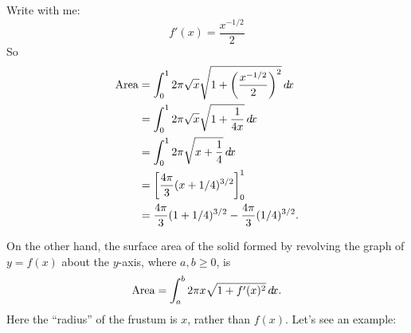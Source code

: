 \documentclass{ximera}
\begin{document}
\begin{example}
\begin{explanation}
\begin{image}
    \end{image}
    Write with me:
    \[
    f'(x) = \frac{x^{-1/2}}{2}
    \]
    So
    \begin{align*}
      \text{Area} &= \int_0^1 2\pi \sqrt{x} \sqrt{1 + \left(\frac{x^{-1/2}}{2}\right)^2} \mathop{}\!d\! x\\
      &= \int_0^1 2\pi \sqrt{x} \sqrt{1 + \frac{1}{4x}} \mathop{}\!d\! x\\
      &= \int_0^1 2\pi \sqrt{x+\frac{1}{4}} \mathop{}\!d\! x\\
      &= \bigg[ \frac{4\pi}{3}(x+1/4)^{3/2} \bigg]_0^1\\
      &= \frac{4\pi}{3}(1+1/4)^{3/2}  - \frac{4\pi}{3}(1/4)^{3/2}.
    \end{align*}
  \end{explanation}
\end{example}


On the other hand, the surface area of the solid formed by revolving
the graph of $y=f(x)$ about the $y$-axis, where $a,b\ge 0$, is
\[
\text{Area} = \int_a^b 2\pi x\sqrt{1+f'(x)^2}\mathop{}\!d\! x.
\]
Here the ``radius'' of the frustum is $x$, rather than $f(x)$. Let's
see an example:
\end{document}
